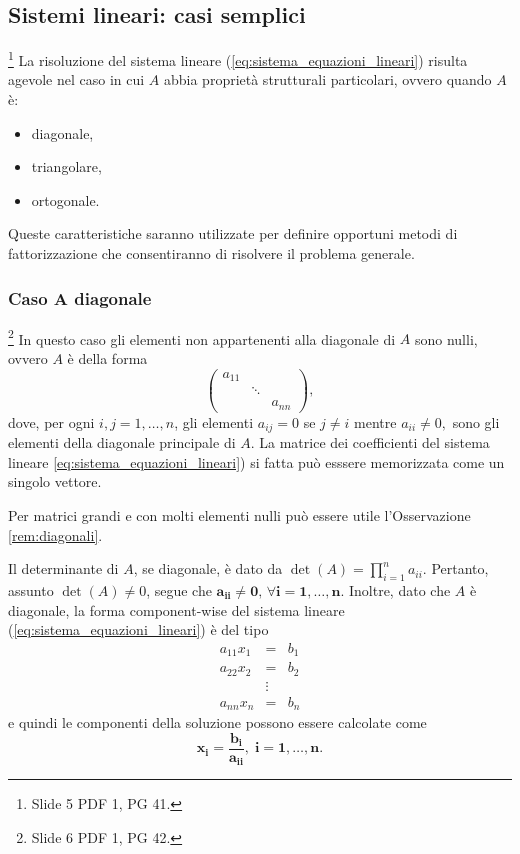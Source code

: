 \subsection{Sistemi lineari: casi semplici}\footnote{Slide 5 PDF 1, PG 41.}
La risoluzione del sistema lineare (\ref{eq:sistema_equazioni_lineari}) risulta agevole nel caso in cui $A$ abbia proprietà strutturali particolari, ovvero quando $A$ è:
\begin{itemize}
    \item diagonale,
    \item triangolare,
    \item ortogonale.
\end{itemize}
Queste caratteristiche saranno utilizzate per definire opportuni metodi di fattorizzazione che consentiranno di risolvere il problema generale.

\subsubsection{Caso \texorpdfstring{$\boldsymbol A$}{A} diagonale}\footnote{Slide 6 PDF 1, PG 42.}
In questo caso gli elementi non appartenenti alla diagonale di $A$ sono nulli, ovvero $A$ è della forma
\begin{equation*}
    \begin{pmatrix}
        a_{11}&&\\
        &\ddots&\\
        &&a_{nn}
    \end{pmatrix},
\end{equation*}
dove, per ogni $i,j=1,\hdots, n$, gli elementi $ a_{ij}=0$ se $j\neq i$ mentre $a_{ii}\neq 0,$ sono gli elementi della diagonale principale di $A$. La matrice dei coefficienti del sistema lineare \ref{eq:sistema_equazioni_lineari}) si fatta può esssere memorizzata come un singolo vettore.

\begin{remark}
    Per matrici grandi e con molti elementi nulli può essere utile l'Osservazione \ref{rem:diagonali}.
\end{remark}

Il determinante di $A$, se diagonale, è dato da $\det(A)=\prod_{i=1}^n a_{ii}.$ Pertanto, assunto $\det(A)\neq 0$, segue che $\boldsymbol{a_{ii}\neq 0,\, \forall i=1,\hdots,n}.$ Inoltre, dato che $A$ è diagonale, la \gls{forma component-wise} del sistema lineare (\ref{eq:sistema_equazioni_lineari}) è del tipo
\begin{equation*}
    \begin{matrix}
        a_{11} x_1 &=& b_1\\
        a_{22} x_2 &=& b_2\\
        &\vdots&\\
        a_{nn}x_n &=& b_n
    \end{matrix}
\end{equation*}
e quindi le componenti della soluzione possono essere calcolate come
\begin{equation}\label{eq:soluzione_matrice_diagonale}
    \boldsymbol{x_i=\frac{b_i}{a_{ii}},\; i=1,\hdots, n.}
\end{equation}

